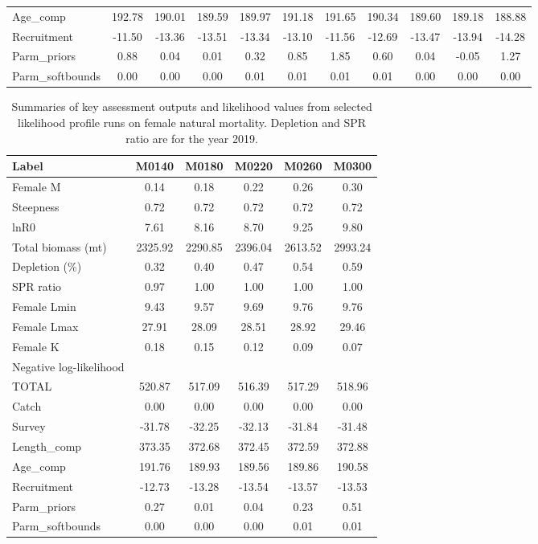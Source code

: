 \documentclass[12pt,]{article}
\begin{document}
\begin{landscape}
\begin{table}[ht]
\begin{tabular}{l|ccccc|ccccc}
  Age\_comp & 192.78 & 190.01 & 189.59 & 189.97 & 191.18 & 191.65 & 190.34 & 189.60 & 189.18 & 188.88 \\ 
  Recruitment & -11.50 & -13.36 & -13.51 & -13.34 & -13.10 & -11.56 & -12.69 & -13.47 & -13.94 & -14.28 \\ 
  Parm\_priors & 0.88 & 0.04 & 0.01 & 0.32 & 0.85 & 1.85 & 0.60 & 0.04 & -0.05 & 1.27 \\ 
  Parm\_softbounds & 0.00 & 0.00 & 0.00 & 0.01 & 0.01 & 0.01 & 0.01 & 0.00 & 0.00 & 0.00 \\ 
   \hline
\end{tabular}
\end{table}
\begin{table}[ht]
\centering
\caption{Summaries of key assessment outputs 
                                              and likelihood values from selected 
                                              likelihood profile runs on female 
                                              natural mortality.  Depletion and SPR ratio 
                                              are for the year 2019.} 
\label{tab:like_profiles2}
\begin{tabular}{l|ccccc}
  \hline
Label & M0140 & M0180 & M0220 & M0260 & M0300 \\ 
  \hline
Female M & 0.14 & 0.18 & 0.22 & 0.26 & 0.30 \\ 
  Steepness & 0.72 & 0.72 & 0.72 & 0.72 & 0.72 \\ 
  lnR0 & 7.61 & 8.16 & 8.70 & 9.25 & 9.80 \\ 
  Total biomass (mt) & 2325.92 & 2290.85 & 2396.04 & 2613.52 & 2993.24 \\ 
  Depletion (\%) & 0.32 & 0.40 & 0.47 & 0.54 & 0.59 \\ 
  SPR ratio & 0.97 & 1.00 & 1.00 & 1.00 & 1.00 \\ 
  Female Lmin & 9.43 & 9.57 & 9.69 & 9.76 & 9.76 \\ 
  Female Lmax & 27.91 & 28.09 & 28.51 & 28.92 & 29.46 \\ 
  Female K & 0.18 & 0.15 & 0.12 & 0.09 & 0.07 \\ 
  Negative log-likelihood &  &  &  &  &  \\ 
  TOTAL & 520.87 & 517.09 & 516.39 & 517.29 & 518.96 \\ 
  Catch & 0.00 & 0.00 & 0.00 & 0.00 & 0.00 \\ 
  Survey & -31.78 & -32.25 & -32.13 & -31.84 & -31.48 \\ 
  Length\_comp & 373.35 & 372.68 & 372.45 & 372.59 & 372.88 \\ 
  Age\_comp & 191.76 & 189.93 & 189.56 & 189.86 & 190.58 \\ 
  Recruitment & -12.73 & -13.28 & -13.54 & -13.57 & -13.53 \\ 
  Parm\_priors & 0.27 & 0.01 & 0.04 & 0.23 & 0.51 \\ 
  Parm\_softbounds & 0.00 & 0.00 & 0.00 & 0.01 & 0.01 \\ 
   \hline
\end{tabular}
\end{table}

\end{landscape}
\end{document}

